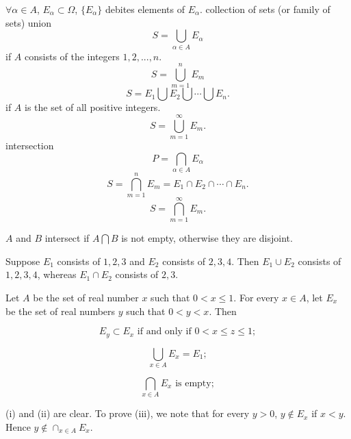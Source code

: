 \begin{mydef}
    \label{mydef:2.9}
    $\forall \alpha\in A$, $E_\alpha \subset \Omega$, $\{E_\alpha\}$ debites elements of $E_\alpha$.
    collection of sets (or family of sets)
    union
    \begin{equation}
        \label{eq:2.1}
        S = \bigcup_{\alpha\in A} E_\alpha
    \end{equation}
    if $A$ consists of the integers $1,2,...,n$.
    \begin{equation}
        \label{eq:2.2}
        S = \bigcup_{m=1}^n E_m
    \end{equation}
    \begin{equation}
        \label{eq:2.3}
        S = E_1 \bigcup E_2 \bigcup \cdots \bigcup E_n.
    \end{equation}
    if $A$ is the set of all positive integers.
    \begin{equation}
        \label{eq:2.4}
        S = \bigcup_{m=1}^{\infty} E_m.
    \end{equation}
    intersection
    \begin{equation}
        \label{eq:2.5}
        P = \bigcap_{\alpha\in A} E_\alpha
    \end{equation}
    \begin{equation}
        \label{eq:2.6}
        S = \bigcap_{m=1}^n E_m = E_1 \cap E_2 \cap \cdots \cap E_n.
    \end{equation}
    \begin{equation}
        \label{eq:2.7}
        S = \bigcap_{m=1}^{\infty} E_m.
    \end{equation}

    $A$ and $B$ intersect if $A\bigcap B$ is not empty, otherwise they are disjoint.
\end{mydef}

\begin{newexample}
    \begin{asparaenum}[(a)]
        \item Suppose $E_1$ consists of $1,2,3$ and
        $E_2$ consists of $2,3,4$.
        Then $E_1 \cup E_2$ consists of $1,2,3,4$,
        whereas $E_1 \cap E_2$ consists of $2,3$.
        \item Let $A$ be the set of real number $x$ such that $0< x\leq 1$.
        For every $x \in A$, let $E_x$ be the set of real numbers $y$ such that $0 < y < x$. Then
        \begin{asparaenum}[(i)]
            \item \[E_y \subset E_x \text{ if and only if } 0 < x \leq z \leq 1;\]
            \item \[\bigcup_{x\in A}E_x = E_1;\]
            \item \[\bigcap_{x\in A}E_x \text{ is empty};\]
        \end{asparaenum}
        (i) and (ii) are clear.
        To prove (iii), we note that for every $y>0$, $y \not\in E_x$ if $x < y$.
        Hence $y \not\in \cap_{x\in A}E_x$.
    \end{asparaenum}
\end{newexample}

